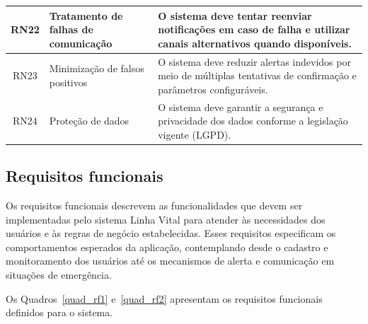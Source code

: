 \begin{table}[H]
\begin{tabular}{|c|p{4cm}|p{8cm}|}
RN22 & Tratamento de falhas de comunicação &
O sistema deve tentar reenviar notificações em caso de falha e utilizar canais alternativos quando disponíveis. \\
\hline

RN23 & Minimização de falsos positivos &
O sistema deve reduzir alertas indevidos por meio de múltiplas tentativas de confirmação e parâmetros configuráveis. \\
\hline

RN24 & Proteção de dados &
O sistema deve garantir a segurança e privacidade dos dados conforme a legislação vigente (LGPD). \\
\hline

\end{tabular}

\end{table}


\subsection{Requisitos funcionais}

Os requisitos funcionais descrevem as funcionalidades que devem ser implementadas pelo sistema Linha Vital para atender às necessidades dos usuários e às regras de negócio estabelecidas. Esses requisitos especificam os comportamentos esperados da aplicação, contemplando desde o cadastro e monitoramento dos usuários até os mecanismos de alerta e comunicação em situações de emergência.

Os Quadros~\ref{quad_rf1} e~\ref{quad_rf2} apresentam os requisitos funcionais definidos para o sistema.

